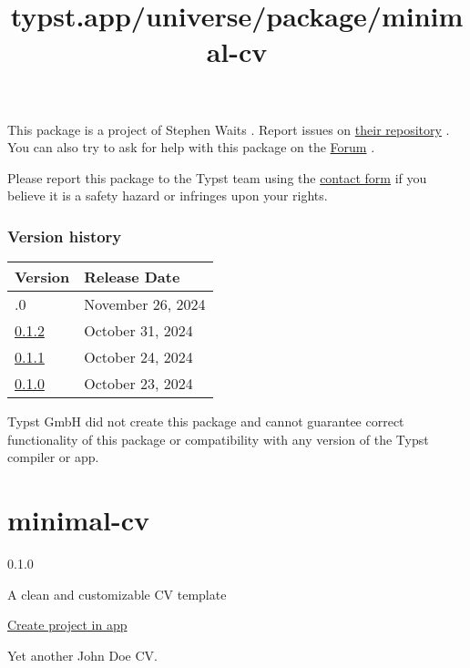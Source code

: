 This package is a project of Stephen Waits . Report issues on
\href{https://github.com/swaits/typst-collection}{their repository} .
You can also try to ask for help with this package on the
\href{https://forum.typst.app}{Forum} .

Please report this package to the Typst team using the
\href{https://typst.app/contact}{contact form} if you believe it is a
safety hazard or infringes upon your rights.

\label{versions}
\subsubsection{Version history}\label{version-history}

\begin{longtable}[]{@{}ll@{}}
\toprule\noalign{}
Version & Release Date \\
\midrule\noalign{}
\endhead
\bottomrule\noalign{}
\endlastfoot
0.2.0 & November 26, 2024 \\
\href{https://typst.app/universe/package/glossy/0.1.2/}{0.1.2} & October
31, 2024 \\
\href{https://typst.app/universe/package/glossy/0.1.1/}{0.1.1} & October
24, 2024 \\
\href{https://typst.app/universe/package/glossy/0.1.0/}{0.1.0} & October
23, 2024 \\
\end{longtable}

Typst GmbH did not create this package and cannot guarantee correct
functionality of this package or compatibility with any version of the
Typst compiler or app.


\title{typst.app/universe/package/minimal-cv}

\label{banner}
\label{template-thumbnail}

\section{minimal-cv}\label{minimal-cv}

{ 0.1.0 }

A clean and customizable CV template

\href{/app?template=minimal-cv&version=0.1.0}{Create project in app}

\label{readme}
Yet another John Doe CV.

